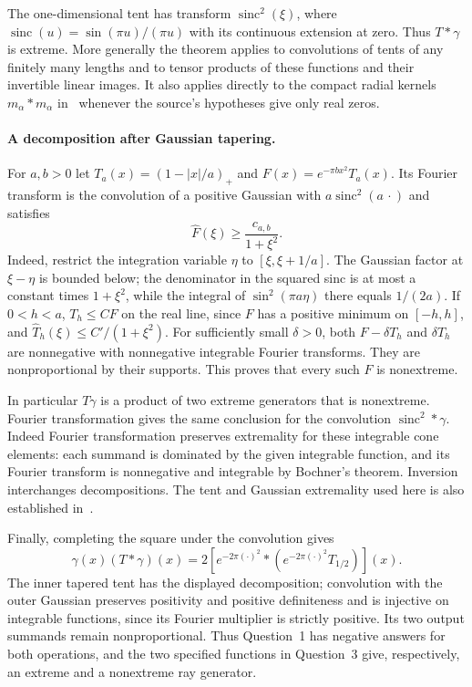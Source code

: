 \documentclass[11pt,a4paper]{article}
\numberwithin{equation}{section}
\begin{document}
The one-dimensional tent has transform
$\operatorname{sinc}^2(\xi)$, where
$\operatorname{sinc}(u)=\sin(\pi u)/(\pi u)$ with its continuous
extension at zero. Thus $T*\gamma$ is extreme. More generally the
theorem applies to convolutions of tents of any finitely many lengths
and to tensor products of these functions and their invertible linear
images. It also applies directly to the compact radial kernels
$m_\alpha*m_\alpha$ in~\cite[Corollary 3.3]{JMR2009} whenever the
source's hypotheses give only real zeros.

\paragraph{A decomposition after Gaussian tapering.}
For $a,b>0$ let $T_a(x)=(1-|x|/a)_+$ and
$F(x)=e^{-\pi b x^2}T_a(x)$. Its Fourier transform is the convolution
of a positive Gaussian with $a\operatorname{sinc}^2(a\,\cdot)$ and
satisfies
\[
 \widehat F(\xi)\ge\frac{c_{a,b}}{1+\xi^2}.
\]
Indeed, restrict the integration variable $\eta$ to
$[\xi,\xi+1/a]$. The Gaussian factor at $\xi-\eta$ is bounded below;
the denominator in the squared sinc is at most a constant times
$1+\xi^2$, while the integral of $\sin^2(\pi a\eta)$ there equals
$1/(2a)$. If $0<h<a$, $T_h\le C F$ on the real line, since $F$
has a positive minimum on $[-h,h]$, and
$\widehat T_h(\xi)\le C'/(1+\xi^2)$. For sufficiently small
$\delta>0$, both $F-\delta T_h$ and $\delta T_h$ are nonnegative with
nonnegative integrable Fourier transforms. They are nonproportional by
their supports. This proves that every such $F$ is nonextreme.

In particular $T\gamma$ is a product of two extreme generators that is
nonextreme. Fourier transformation gives the same conclusion for the
convolution $\operatorname{sinc}^2*\gamma$. Indeed Fourier
transformation preserves extremality for these integrable cone elements:
each summand is dominated by the given integrable function, and its
Fourier transform is nonnegative and integrable by Bochner's theorem.
Inversion interchanges decompositions. The tent and Gaussian
extremality used here is also established in~\cite{JMR2009}.

Finally, completing the square under the convolution gives
\[
 \gamma(x)(T*\gamma)(x)
 =2\left[e^{-2\pi(\cdot)^2}*
       \left(e^{-2\pi(\cdot)^2}T_{1/2}\right)\right](x).
\]
The inner tapered tent has the displayed decomposition; convolution
with the outer Gaussian preserves positivity and positive definiteness
and is injective on integrable functions, since its Fourier multiplier
is strictly positive. Its two output summands remain nonproportional.
Thus Question~1 has negative answers for both operations, and the two
specified functions in Question~3 give, respectively, an extreme and a
nonextreme ray generator.
\end{document}
